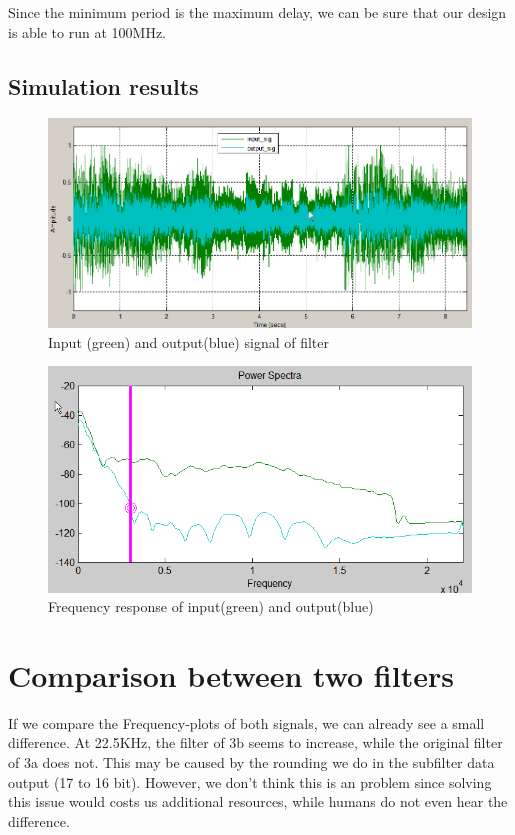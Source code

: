 \documentclass[a4paper,twoside,11pt, fleqn]{article}
\begin{document}
Since the minimum period is the maximum delay, we can be sure that our design is able to run at 100MHz.

\subsection{Simulation results}
\begin{figure}[h]
	\includegraphics[scale = 0.71]{Images/3b_timedomain_inputoutput}
    \caption{Input (green) and output(blue) signal of filter}
\end{figure}

\begin{figure}[h]
	\includegraphics[scale = 0.92]{Images/3b_powerspectra}
    \caption{Frequency response of input(green) and output(blue)}
\end{figure}


\newpage
\section{Comparison between two filters}
If we compare the Frequency-plots of both signals, we can already see a small difference. At 22.5KHz, the filter of 3b seems to increase, while the original filter of 3a does not. This may be caused by the rounding we do in the subfilter data output (17 to 16 bit). However, we don't think this is an problem since solving this issue would costs us additional resources, while humans do not even hear the difference.
\end{document}
